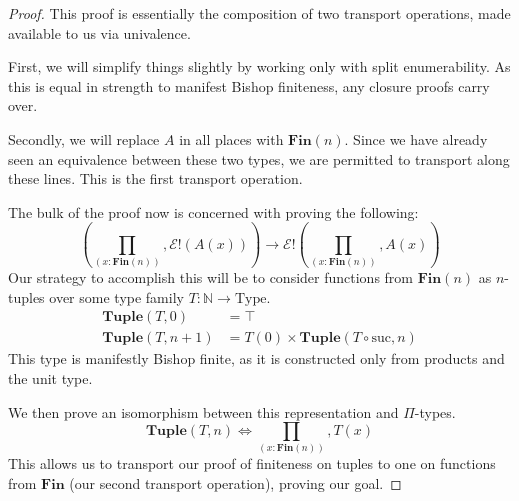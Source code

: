 \begin{proof}
  This proof is essentially the composition of two transport operations, made
  available to us via univalence.
  
  First, we will simplify things slightly by working only with split
  enumerability.
  As this is equal in strength to manifest Bishop finiteness, any closure proofs
  carry over.

  Secondly, we will replace \(A\) in all places with \(\mathbf{Fin}(n)\).
  Since we have already seen an equivalence between these two types, we are
  permitted to transport along these lines.
  This is the first transport operation.

  The bulk of the proof now is concerned with proving the following:
  \begin{equation}
    \left( \prod_{(x : \mathbf{Fin}(n))} , \mathcal{E}!(A(x)) \right) \rightarrow \mathcal{E}!\left( \prod_{(x : \mathbf{Fin}(n))} , A(x) \right)
  \end{equation}
  Our strategy to accomplish this will be to consider functions from
  \(\mathbf{Fin}(n)\) as \(n\)-tuples over some type family \(T : \mathbb{N}
  \rightarrow \text{Type}\).
  \begin{equation}
    \begin{aligned}
      \mathbf{Tuple}(T, 0)   &= \top \\
      \mathbf{Tuple}(T, n+1) &= T(0) \times \mathbf{Tuple}(T \circ \text{suc}, n)
    \end{aligned}
  \end{equation}
  This type is manifestly Bishop finite, as it is constructed only from products
  and the unit type.
  
  We then prove an isomorphism between this representation and \(\Pi\)-types.
  \begin{equation}
    \mathbf{Tuple}(T, n) \iff \prod_{(x : \mathbf{Fin}(n))} , T(x)
  \end{equation}
  This allows us to transport our proof of finiteness on tuples to one on
  functions from \(\mathbf{Fin}\) (our second transport operation), proving our
  goal.
  
\end{proof}
